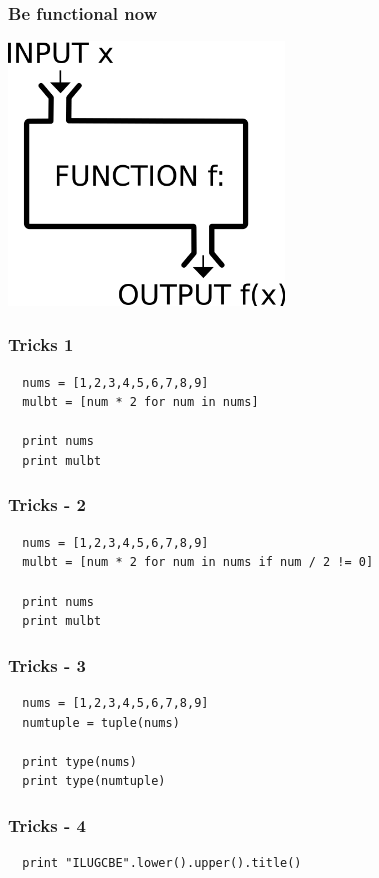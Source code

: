 \documentclass{beamer}
\begin{document}
\begin{frame}
 \frametitle{Be functional now}
 \begin{center}
  \includegraphics[height=7cm]{fun.png}
 \end{center}

\end{frame}

\begin{frame}[fragile]
 \frametitle{Tricks 1}
 \begin{verbatim}
  nums = [1,2,3,4,5,6,7,8,9]
  mulbt = [num * 2 for num in nums]
  
  print nums
  print mulbt
 \end{verbatim}

\end{frame}

\begin{frame}[fragile]
 \frametitle{Tricks - 2}
 \begin{verbatim}
  nums = [1,2,3,4,5,6,7,8,9]
  mulbt = [num * 2 for num in nums if num / 2 != 0]
  
  print nums
  print mulbt
 \end{verbatim}

\end{frame}

\begin{frame}[fragile]
 \frametitle{Tricks - 3}
 \begin{verbatim}
  nums = [1,2,3,4,5,6,7,8,9]
  numtuple = tuple(nums)

  print type(nums)
  print type(numtuple)
 \end{verbatim}

\end{frame}

\begin{frame}[fragile]
 \frametitle{Tricks - 4}
 \begin{verbatim}
  print "ILUGCBE".lower().upper().title()
 \end{verbatim}

\end{frame}
\end{document}
